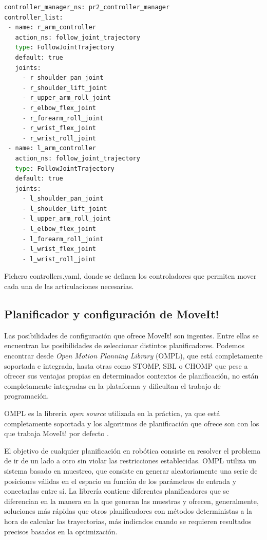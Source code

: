 \documentclass[12pt,spanish,chapterprefix, numbers=noenddot]{book}
\numberwithin{equation}{section}
\numberwithin{figure}{section}
\begin{document}
\begin{algorithm}[htb!]
	\begin{lstlisting}[breaklines=true,language=python] 
controller_manager_ns: pr2_controller_manager
controller_list:
 - name: r_arm_controller
   action_ns: follow_joint_trajectory
   type: FollowJointTrajectory
   default: true
   joints:
     - r_shoulder_pan_joint
     - r_shoulder_lift_joint
     - r_upper_arm_roll_joint
     - r_elbow_flex_joint
     - r_forearm_roll_joint
     - r_wrist_flex_joint
     - r_wrist_roll_joint
 - name: l_arm_controller
   action_ns: follow_joint_trajectory
   type: FollowJointTrajectory
   default: true
   joints:
     - l_shoulder_pan_joint
     - l_shoulder_lift_joint
     - l_upper_arm_roll_joint
     - l_elbow_flex_joint
     - l_forearm_roll_joint
     - l_wrist_flex_joint
     - l_wrist_roll_joint
	\end{lstlisting}
\caption{\label{alg:pr2_controllers}Fichero controllers.yaml, donde se definen los controladores que permiten mover cada una de las articulaciones necesarias.}
\end{algorithm}

\subsection{Planificador y configuración de MoveIt!}
Las posibilidades de configuración que ofrece MoveIt! son ingentes. Entre ellas se encuentran las posibilidades de seleccionar distintos planificadores. Podemos encontrar desde \textit{Open Motion Planning Library} (OMPL), que está completamente soportada e integrada, hasta otras como STOMP, SBL o CHOMP que pese a ofrecer sus ventajas propias en determinados contextos de planificación, no están completamente integradas en la plataforma y dificultan el trabajo de programación. 

OMPL es la librería \textit{open source} utilizada en la práctica, ya que está completamente soportada y los algoritmos de planificación que ofrece son con los que trabaja MoveIt! por defecto \cite{moveit_planners}.

El objetivo de cualquier planificación en robótica consiste en resolver el problema de ir de un lado a otro sin violar las restricciones establecidas. OMPL utiliza un sistema basado en muestreo, que consiste en generar aleatoriamente una serie de posiciones válidas en el espacio en función de los parámetros de entrada y conectarlas entre sí.
\newpage
La librería contiene diferentes planificadores que se diferencian en la manera en la que generan las muestras y ofrecen, generalmente, soluciones más rápidas que otros planificadores con métodos deterministas  a la hora de calcular las trayectorias, más indicados cuando se requieren resultados precisos basados en la optimización.
\end{document}
